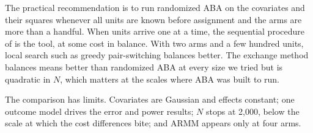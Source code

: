 \documentclass[11pt]{article}
\theoremstyle{remark}
\begin{document}
The practical recommendation is to run randomized ABA on the covariates and
their squares whenever all units are known before assignment and the arms
are more than a handful. When units arrive one at a time, the sequential
procedure of \citet{zhang2023} is the tool, at some cost in balance. With two
arms and a few hundred units, local search such as greedy pair-switching
balances better. The exchange method balances means better than randomized
ABA at every size we tried but is quadratic in $N$, which matters at the
scales where ABA was built to run.

The comparison has limits. Covariates are Gaussian and effects constant; one
outcome model drives the error and power results; $N$ stops at 2{,}000,
below the scale at which the cost differences bite; and ARMM appears only at
four arms.




\end{document}
